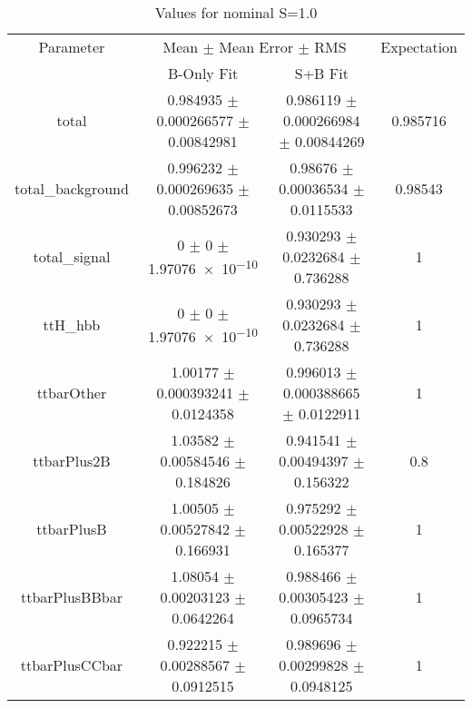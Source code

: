 \begin{table}
\centering
\caption{Values for nominal S=1.0}
\begin{tabular}{cccc}
\toprule
Parameter & \multicolumn{2}{c}{Mean $\pm$ Mean Error $\pm$ RMS} & Expectation\\
 & B-Only Fit & S+B Fit & \\
\midrule
total & \num{0.984935} $\pm$ \num{0.000266577} $\pm$ \num{0.00842981} & \num{0.986119} $\pm$ \num{0.000266984} $\pm$ \num{0.00844269} & \num{0.985716}\\
total\_background & \num{0.996232} $\pm$ \num{0.000269635} $\pm$ \num{0.00852673} & \num{0.98676} $\pm$ \num{0.00036534} $\pm$ \num{0.0115533} & \num{0.98543}\\
total\_signal & \num{0} $\pm$ \num{0} $\pm$ \num{1.97076e-10} & \num{0.930293} $\pm$ \num{0.0232684} $\pm$ \num{0.736288} & \num{1}\\
ttH\_hbb & \num{0} $\pm$ \num{0} $\pm$ \num{1.97076e-10} & \num{0.930293} $\pm$ \num{0.0232684} $\pm$ \num{0.736288} & \num{1}\\
ttbarOther & \num{1.00177} $\pm$ \num{0.000393241} $\pm$ \num{0.0124358} & \num{0.996013} $\pm$ \num{0.000388665} $\pm$ \num{0.0122911} & \num{1}\\
ttbarPlus2B & \num{1.03582} $\pm$ \num{0.00584546} $\pm$ \num{0.184826} & \num{0.941541} $\pm$ \num{0.00494397} $\pm$ \num{0.156322} & \num{0.8}\\
ttbarPlusB & \num{1.00505} $\pm$ \num{0.00527842} $\pm$ \num{0.166931} & \num{0.975292} $\pm$ \num{0.00522928} $\pm$ \num{0.165377} & \num{1}\\
ttbarPlusBBbar & \num{1.08054} $\pm$ \num{0.00203123} $\pm$ \num{0.0642264} & \num{0.988466} $\pm$ \num{0.00305423} $\pm$ \num{0.0965734} & \num{1}\\
ttbarPlusCCbar & \num{0.922215} $\pm$ \num{0.00288567} $\pm$ \num{0.0912515} & \num{0.989696} $\pm$ \num{0.00299828} $\pm$ \num{0.0948125} & \num{1}\\
\bottomrule
\end{tabular}
\end{table}